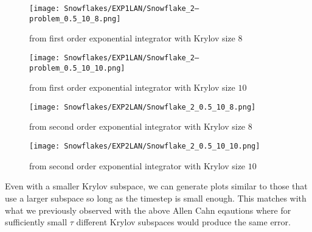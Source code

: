 \begin{figure}[H]
    \centering
    \begin{minipage}{0.49\textwidth}
        \texttt{[image: Snowflakes/EXP1LAN/Snowflake\_2--problem\_0.5\_10\_8.png]} %
        \caption{from first order exponential integrator with Krylov size $8$}
        \label{fig:first order 8 0.5}
    \end{minipage}\hfill
    \centering
    \begin{minipage}{0.49\textwidth}
        \texttt{[image: Snowflakes/EXP1LAN/Snowflake\_2--problem\_0.5\_10\_10.png]} %
        \caption{from first order exponential integrator with Krylov size $10$}
        \label{fig:first order 10 0.5}
    \end{minipage}\hfill
\end{figure}
\begin{figure}[H]
    \centering
    \begin{minipage}{0.49\textwidth}
        \texttt{[image: Snowflakes/EXP2LAN/Snowflake\_2\_0.5\_10\_8.png]} %
        \caption{from second order exponential integrator with Krylov size $8$}
        \label{fig:second order 8 0.5}
    \end{minipage}\hfill
    \centering
    \begin{minipage}{0.49\textwidth}
        \texttt{[image: Snowflakes/EXP2LAN/Snowflake\_2\_0.5\_10\_10.png]} %
        \caption{from second order exponential integrator with Krylov size $10$}
        \label{fig:second order 10 0.5}
    \end{minipage}\hfill
\end{figure}

Even with a smaller Krylov subspace, we can generate plots similar to those that use a larger subspace so long as the timestep is small enough.
This matches with what we previously observed with the above Allen Cahn eqautions where for sufficiently small $\tau$ different Krylov subspaces would produce the same error.